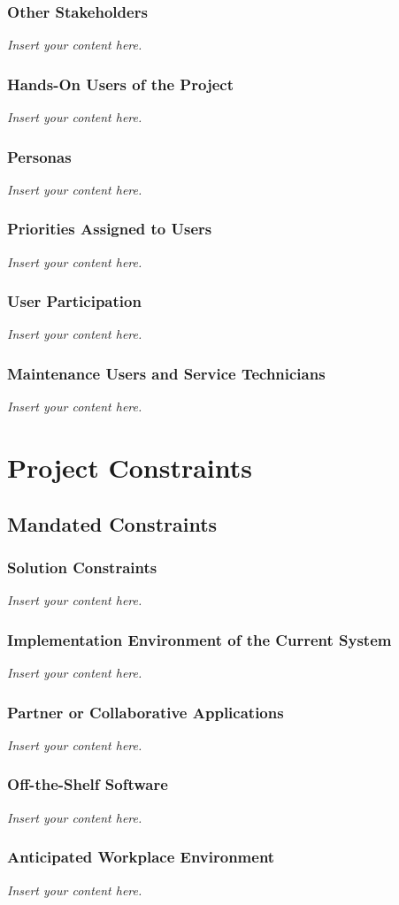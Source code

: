 \documentclass[12pt]{article}
\newcommand{\lips}{\textit{Insert your content here.}}
\begin{document}
\subsubsection{Other Stakeholders}
\lips
\subsubsection{Hands-On Users of the Project}
\lips
\subsubsection{Personas}
\lips
\subsubsection{Priorities Assigned to Users}
\lips
\subsubsection{User Participation}
\lips
\subsubsection{Maintenance Users and Service Technicians}
\lips

\section{Project Constraints}
\subsection{Mandated Constraints}
\subsubsection{Solution Constraints}
\lips
\subsubsection{Implementation Environment of the Current System}
\lips
\subsubsection{Partner or Collaborative Applications}
\lips
\subsubsection{Off-the-Shelf Software}
\lips
\subsubsection{Anticipated Workplace Environment}
\lips
\end{document}
